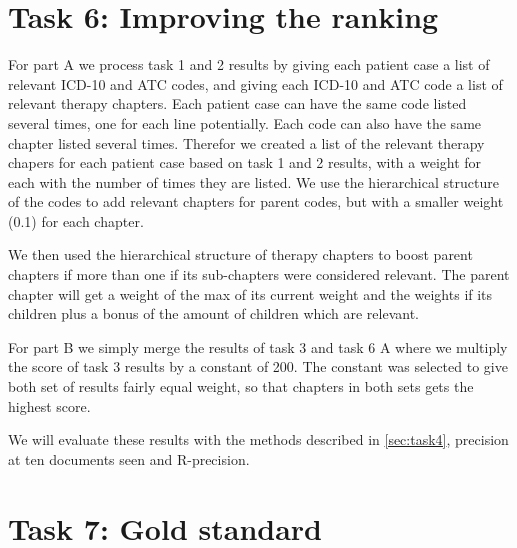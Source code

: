 \section{Task 6: Improving the ranking}
For part A we process task 1 and 2 results by giving each patient case a list
of relevant ICD-10 and ATC codes, and giving each ICD-10 and ATC code a list
of relevant therapy chapters. Each patient case can have the same code listed
several times, one for each line potentially. Each code can also have the same
chapter listed several times. Therefor we created a list of the relevant
therapy chapers for each patient case based on task 1 and 2 results, with a
weight for each with the number of times they are listed. We use the
hierarchical structure of the codes to add relevant chapters for parent codes,
but with a smaller weight (0.1) for each chapter.

We then used the hierarchical structure of therapy chapters to boost parent
chapters if more than one if its sub-chapters were considered relevant. The
parent chapter will get a weight of the max of its current weight and the
weights if its children plus a bonus of the amount of children which are
relevant.

For part B we simply merge the results of task 3 and task 6 A where we
multiply the score of task 3 results by a constant of 200. The constant was
selected to give both set of results fairly equal weight, so that chapters
in both sets gets the highest score.

We will evaluate these results with the methods described in
\autoref{sec:task4}, precision at ten documents seen and R-precision.


\section{Task 7: Gold standard}


